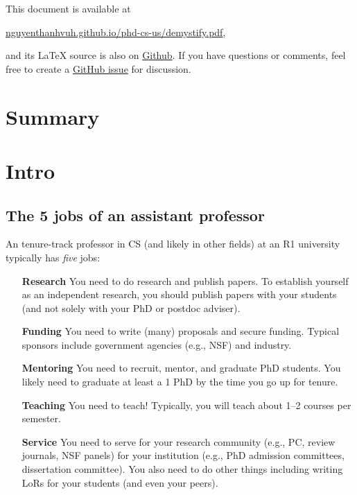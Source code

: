 \documentclass[oneside,11pt]{memoir}
\begin{document}
This document is available at 

\begin{center}
  \href{https://nguyenthanhvuh.github.io/phd-cs-us/demystify.pdf}{nguyenthanhvuh.github.io/phd-cs-us/demystify.pdf},
\end{center}

\noindent and its \LaTeX{} source is also on \href{https://github.com/nguyenthanhvuh/phd-cs-us}{Github}. If you have questions or comments, feel free to create a \href{https://github.com/nguyenthanhvuh/phd-cs-us/issues}{GitHub issue} for discussion.

\newpage
\tableofcontents*

\chapter{Summary}\label{sec:summary}
\mainmatter
\chapter{Intro}


\section{The 5 jobs of an assistant professor}
An tenure-track professor in CS (and likely in other fields) at an R1 university typically has \emph{five} jobs:

\begin{enumerate}
\item[\textbf{Research}] You need to do research and publish papers.  To establish yourself as an independent research, you should publish papers with your students (and not solely with your PhD or postdoc adviser).

\item[\textbf{Funding}] You need to write (many) proposals and secure funding. Typical sponsors include government agencies (e.g., NSF) and industry.

\item[\textbf{Mentoring}] You need to recruit, mentor, and graduate PhD students.  You likely need to graduate at least a 1 PhD by the time you go up for tenure.

\item[\textbf{Teaching}] You need to teach! Typically, you will teach about 1--2 courses per semester.

  \item[\textbf{Service}]  You need to serve for your research community (e.g., PC, review journals, NSF panels) for your institution (e.g., PhD admission committees, dissertation committee).  You also need to do other things including writing LoRs for your students (and even your peers).


\end{enumerate}
\end{document}
